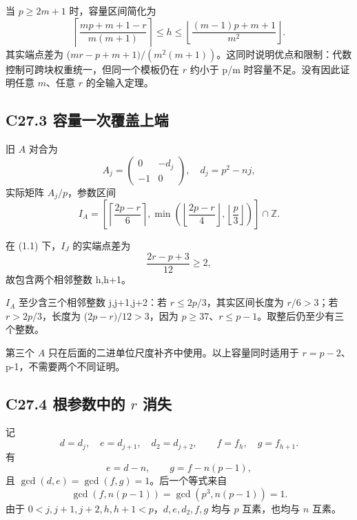 \documentclass[11pt,a4paper]{article}
\theoremstyle{definition}
\numberwithin{equation}{section}
\begin{document}
{当} {\ensuremath{p\ge 2m+1}} {时，容量区间简化为} \[
\left\lceil\frac{mp+m+1-r}{m(m+1)}\right\rceil
\le h\le
\left\lfloor\frac{(m-1)p+m+1}{m^2}\right\rfloor.
\tag{C27.2.7}
\] {其实端点差为} {(\ensuremath{mr-p+m+1)/(m^{2}(m+1))}。这同时说明优点和限制：代数控制可跨块权重统一，但同一个模板仍在} {\ensuremath{r}} {约小于} {p/m} {时容量不足。没有因此证明任意} {\ensuremath{m}、任意} {\ensuremath{r}} {的全输入定理。}

\subsection*{\texorpdfstring{{C27.3} {容量一次覆盖上端}}{C27.3 容量一次覆盖上端}}\label{C27-h170}

{旧} {\ensuremath{A}} {对合为} \[
A_j=\begin{pmatrix}0&-d_j\\-1&0\end{pmatrix},
\quad d_j=p^2-nj,
\] {实际矩阵} {\ensuremath{A_{j}/p}，参数区间} \[
I_A=
\left[
\left\lceil\frac{2p-r}{6}\right\rceil,
\min\left(\left\lfloor\frac{2p-r}{4}\right\rfloor,
\left\lfloor\frac p3\right\rfloor\right)
\right]\cap\mathbb Z.
\]

{在} {(1.1)} {下，\ensuremath{I_{J}}} {的实端点差为} \[
\frac{2r-p+3}{12}\ge2,
\] {故包含两个相邻整数} {h,h+1。}

{\ensuremath{I_{A}}} {至少含三个相邻整数} {j,j+1,j+2：若} {\ensuremath{r\le 2p/3}，其实区间长度为} {\ensuremath{r/6>3}；若} {\ensuremath{r>2p/3}，长度为} {(\ensuremath{2p-r)/12>3}，因为} {\ensuremath{p\ge 37}、\ensuremath{r\le p-1}。取整后仍至少有三个整数。}

{第三个} {\ensuremath{A}} {只在后面的二进单位尺度补齐中使用。以上容量同时适用于} {\ensuremath{r=p-2}、p-1，不需要两个不同证明。}

\subsection*{\texorpdfstring{{C27.4} {根参数中的} {\ensuremath{r}} {消失}}{C27.4 根参数中的  消失}}\label{C27-h171}

{记} \[
d=d_j,\quad e=d_{j+1},\quad d_2=d_{j+2},\qquad
f=f_h,\quad g=f_{h+1}.
\] {有} \[
e=d-n,\qquad g=f-n(p-1),
\] {且} {\ensuremath{\operatorname{gcd}(d,e)=\operatorname{gcd}(f,g)=1}。后一个等式来自} \[
\gcd(f,n(p-1))=\gcd(p^3,n(p-1))=1.
\] {由于} {\ensuremath{0<j,j+1,j+2,h,h+1<p}，\ensuremath{d,e,d_{2},f,g}} {均与} {\ensuremath{p}} {互素，也均与} {\ensuremath{n}} {互素。}
\end{document}

